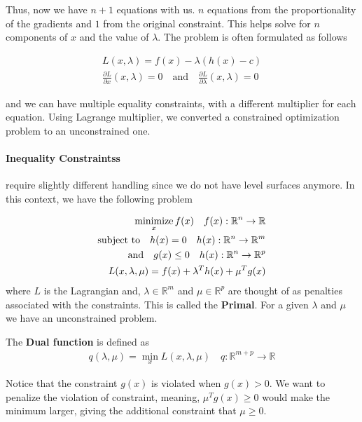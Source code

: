 \documentclass[../statistical_learning_notes.tex]{subfiles}
\begin{document}
Thus, now we have $n+1$ equations with us. $n$ equations from the proportionality of the gradients and $1$ from the original constraint. This helps solve for $n$ components of $x$ and the value of $\lambda$. The problem is often formulated as follows

\begin{gather*}
    L(x, \lambda) = f(x) - \lambda (h(x) - c)\\
    \frac{\partial L}{\partial x}(x, \lambda) = 0 \quad \text{and}\quad \frac{\partial L}{\partial \lambda}(x, \lambda) = 0
\end{gather*}

and we can have multiple equality constraints, with a different multiplier for each equation. Using Lagrange multiplier, we converted a constrained optimization problem to an unconstrained one.

\paragraph{Inequality Constraintss} require slightly different handling since we do not have level surfaces anymore. In this context, we have the following problem

\begin{align*}
    \operatorname*{minimize}_{x} f(x) \quad f(x):\mathbb{R}^{n} \rightarrow \mathbb{R}\\
    \text{subject to} \quad h(x) = 0 \quad h(x):\mathbb{R}^{n} \rightarrow \mathbb{R}^{m}\\
    \text{and} \quad g(x) \leq 0 \quad h(x):\mathbb{R}^{n} \rightarrow \mathbb{R}^{p}\\
    L(x, \lambda, \mu) = f(x) + \lambda^{T}h(x) + \mu^{T}g(x)
\end{align*}
where $L$ is the Lagrangian and, $\lambda \in \mathbb{R}^{m}$ and $\mu \in \mathbb{R}^{p}$ are thought of as penalties associated with the constraints. This is called the \textbf{Primal}. For a given $\lambda$ and $\mu$ we have an unconstrained problem.\newline

The \textbf{Dual function} is defined as
\begin{align*}
    q(\lambda, \mu) = \min_{x} L(x, \lambda, \mu) \quad q:\mathbb{R}^{m+p} \rightarrow \mathbb{R}
\end{align*}

Notice that the constraint $g(x)$ is violated when $g(x) > 0$. We want to penalize the violation of constraint, meaning, $\mu^{T}g(x) \geq 0$ would make the minimum larger, giving the additional constraint that $\mu \geq 0$.\newline
\end{document}

